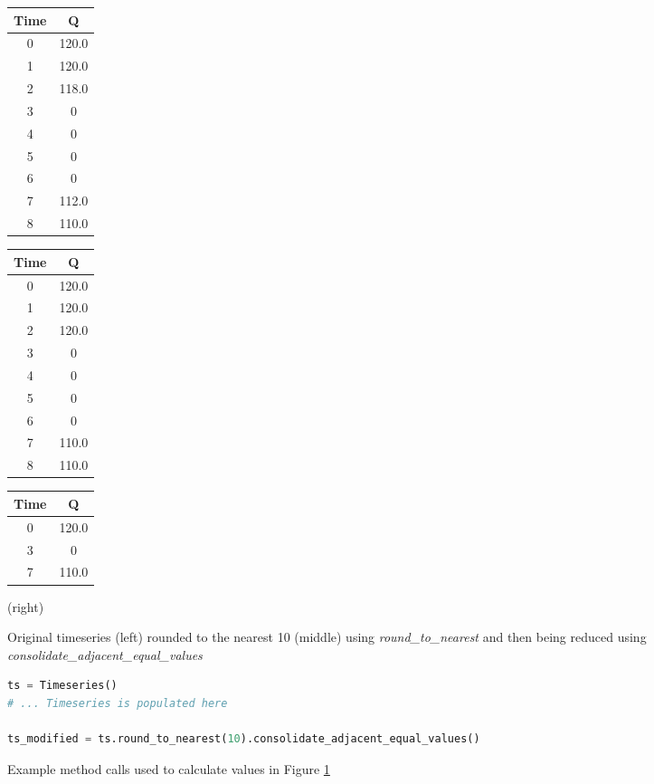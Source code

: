 \documentclass[10pt,twoside,openright]{memoir}
\begin{document}
\begin{figure}[!h]
\begin{tabular}{c c}
    \hline
    Time & Q \\ \hline
    0 & 120.0 \\
    1 & 120.0 \\
    2 & 118.0 \\
    3 & 0 \\
    4 & 0 \\
    5 & 0 \\
    6 & 0 \\
    7 & 112.0 \\
    8 & 110.0
\end{tabular}
\hspace{2cm} 
\begin{tabular}{c c}
    \hline
    Time & Q \\ \hline
    0 & 120.0 \\
    1 & 120.0 \\
    2 & 120.0 \\
    3 & 0 \\
    4 & 0 \\
    5 & 0 \\
    6 & 0 \\
    7 & 110.0 \\
    8 & 110.0
\end{tabular}
\hspace{2cm} 
\begin{tabular}{c c}
    \hline
    Time & Q \\ \hline
    0 & 120.0 \\
    3 & 0 \\
    7 & 110.0
\end{tabular}
\caption{Original timeseries (left) rounded to the nearest 10
(middle) using \emph{round\_to\_nearest} and then being
reduced using \emph{consolidate\_adjacent\_equal\_values}} (right)
\label{fig:roundedandreduced}
\end{figure}

\begin{figure}[!h]
\begin{lstlisting}[language=python]
ts = Timeseries()
# ... Timeseries is populated here

ts_modified = ts.round_to_nearest(10).consolidate_adjacent_equal_values()
\end{lstlisting}
\caption{Example method calls used to calculate values in Figure \ref{fig:roundedandreduced}}
\end{figure}
\end{document}
